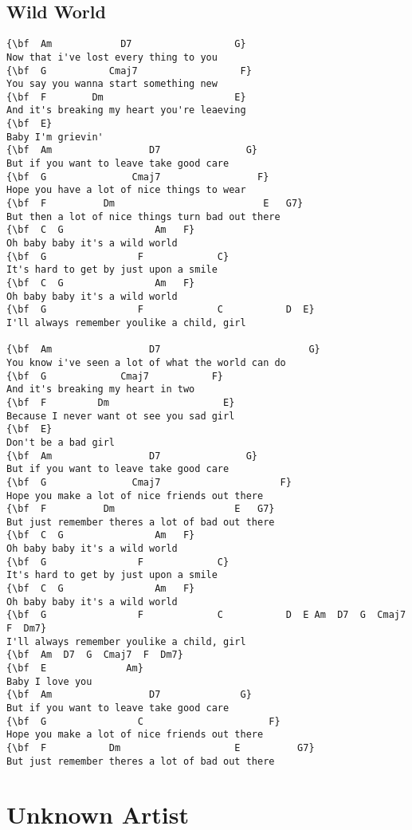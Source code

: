 \documentclass[a4paper]{article}
\begin{document}
\subsection{Wild World}
\begin{Verbatim}[commandchars=\\\{\}]
{\bf  Am            D7                  G}
Now that i've lost every thing to you
{\bf  G           Cmaj7                  F}
You say you wanna start something new
{\bf  F        Dm                       E}
And it's breaking my heart you're leaeving
{\bf  E}
Baby I'm grievin'
{\bf  Am                 D7               G}
But if you want to leave take good care
{\bf  G               Cmaj7                 F}
Hope you have a lot of nice things to wear
{\bf  F          Dm                          E   G7}
But then a lot of nice things turn bad out there
{\bf  C  G                Am   F}
Oh baby baby it's a wild world
{\bf  G                F             C}
It's hard to get by just upon a smile
{\bf  C  G                Am   F}
Oh baby baby it's a wild world
{\bf  G                F             C           D  E}
I'll always remember youlike a child, girl

{\bf  Am                 D7                          G}
You know i've seen a lot of what the world can do
{\bf  G             Cmaj7           F}
And it's breaking my heart in two
{\bf  F         Dm                    E}
Because I never want ot see you sad girl
{\bf  E}
Don't be a bad girl
{\bf  Am                 D7               G}
But if you want to leave take good care
{\bf  G               Cmaj7                     F}
Hope you make a lot of nice friends out there
{\bf  F          Dm                     E   G7}
But just remember theres a lot of bad out there
{\bf  C  G                Am   F}
Oh baby baby it's a wild world
{\bf  G                F             C}
It's hard to get by just upon a smile
{\bf  C  G                Am   F}
Oh baby baby it's a wild world
{\bf  G                F             C           D  E Am  D7  G  Cmaj7  F  Dm7}
I'll always remember youlike a child, girl
{\bf  Am  D7  G  Cmaj7  F  Dm7}
{\bf  E              Am}
Baby I love you
{\bf  Am                 D7              G}
But if you want to leave take good care
{\bf  G                C                      F}
Hope you make a lot of nice friends out there
{\bf  F           Dm                    E          G7}
But just remember theres a lot of bad out there

\end{Verbatim}
\newpage
\section{Unknown Artist}
\end{document}

